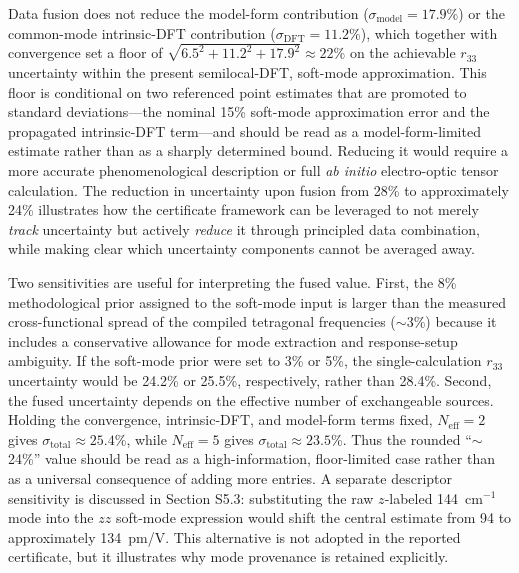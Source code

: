 \documentclass[twocolumn,superscriptaddress,amsmath,amssymb,longbibliography]{revtex4-2}
\begin{document}
Data fusion does not reduce the
model-form contribution ($\sigma_{\mathrm{model}} = 17.9\%$) or the common-mode intrinsic-DFT contribution ($\sigma_{\mathrm{DFT}} = 11.2\%$), which together with convergence set a floor of $\sqrt{6.5^2+11.2^2+17.9^2}\approx 22\%$ on the achievable $r_{33}$ uncertainty within the present semilocal-DFT, soft-mode approximation. This floor is conditional on two referenced point estimates that are promoted to standard deviations---the nominal 15\% soft-mode approximation error and the propagated intrinsic-DFT term---and should be read as a model-form-limited estimate rather than as a sharply determined bound. Reducing it would require a more accurate phenomenological description or full \emph{ab initio} electro-optic tensor calculation.
The reduction in uncertainty upon fusion from 28\% to approximately 24\%  illustrates how  the
certificate framework can be leveraged to not merely \emph{track} uncertainty but actively
\emph{reduce} it through principled data combination, while making clear which uncertainty components cannot be averaged away.

Two sensitivities are useful for interpreting the fused value. First, the
8\% methodological prior assigned to the soft-mode input is larger than the
measured cross-functional spread of the compiled tetragonal frequencies
($\sim$3\%) because it includes a conservative allowance for mode extraction
and response-setup ambiguity. If the soft-mode prior were set to 3\% or 5\%,
the single-calculation $r_{33}$ uncertainty would be 24.2\% or 25.5\%,
respectively, rather than 28.4\%. Second, the fused uncertainty depends on the
effective number of exchangeable sources. Holding the convergence,
intrinsic-DFT, and model-form terms fixed, $N_{\mathrm{eff}}=2$ gives
$\sigma_{\mathrm{total}}\approx25.4\%$, while $N_{\mathrm{eff}}=5$ gives
$\sigma_{\mathrm{total}}\approx23.5\%$. Thus the rounded ``$\sim$24\%''
value should be read as a high-information, floor-limited case rather than as
a universal consequence of adding more entries. A separate descriptor
sensitivity is discussed in Section S5.3: substituting the raw
$z$-labeled 144~cm$^{-1}$ mode into the $zz$ soft-mode expression would shift
the central estimate from 94 to approximately 134~pm/V. This alternative is
not adopted in the reported certificate, but it illustrates why mode
provenance is retained explicitly.
\end{document}
